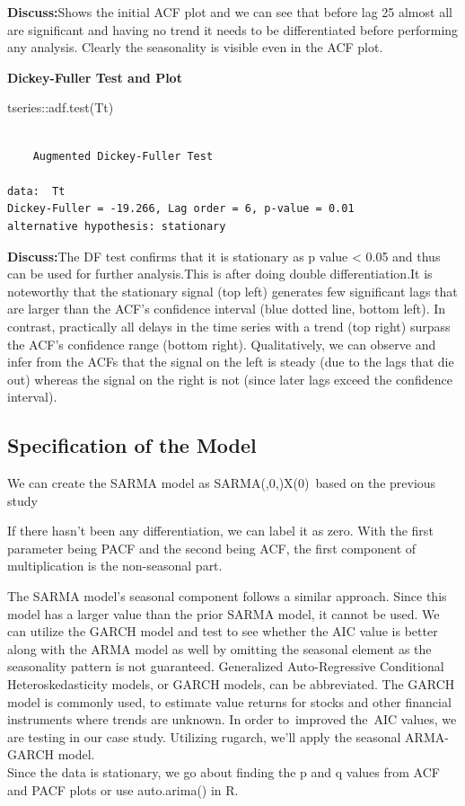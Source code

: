 \documentclass[
  onepage,
  openany]{scrbook}
\newenvironment{Shaded}{}{}
\newcommand{\FunctionTok}[1]{\textcolor[rgb]{0.02,0.16,0.49}{#1}}
\newcommand{\NormalTok}[1]{#1}
\newcommand{\SpecialCharTok}[1]{\textcolor[rgb]{0.25,0.44,0.63}{#1}}
\begin{document}
\textbf{Discuss:}Shows the initial ACF plot and we can see that before
lag 25 almost all are significant and having no trend it needs to be
differentiated before performing any analysis. Clearly the seasonality
is visible even in the ACF plot.

\textbf{Dickey-Fuller Test and Plot}

\begin{Shaded}
\begin{Highlighting}[]
\NormalTok{tseries}\SpecialCharTok{::}\FunctionTok{adf.test}\NormalTok{(Tt)}
\end{Highlighting}
\end{Shaded}

\begin{verbatim}

    Augmented Dickey-Fuller Test

data:  Tt
Dickey-Fuller = -19.266, Lag order = 6, p-value = 0.01
alternative hypothesis: stationary
\end{verbatim}

\textbf{Discuss:}The DF test confirms that it is stationary as p value
\textless{} 0.05 and thus can be used for further analysis.This is after
doing double differentiation.It is noteworthy that the stationary signal
(top left) generates few significant lags that are larger than the ACF's
confidence interval (blue dotted line, bottom left). In contrast,
practically all delays in the time series with a trend (top right)
surpass the ACF's confidence range (bottom right). Qualitatively, we can
observe and infer from the ACFs that the signal on the left is steady
(due to the lags that die out) whereas the signal on the right is not
(since later lags exceed the confidence interval).

\hypertarget{specification-of-the-model}{%
\subsection{Specification of the
Model}\label{specification-of-the-model}}

We can create the SARMA model as SARMA(,0,)X(0)~based on the previous
study ~

If there hasn't been any differentiation, we can label it as zero. With
the first parameter being PACF and the second being ACF, the first
component of multiplication is the non-seasonal part.

The SARMA model's seasonal component follows a similar approach. Since
this model has a larger value than the prior SARMA model, it cannot be
used. We can utilize the GARCH model and test to see whether the AIC
value is better along with the ARMA model as well by omitting the
seasonal element as the seasonality pattern is not guaranteed.
Generalized Auto-Regressive Conditional Heteroskedasticity models, or
GARCH models, can be abbreviated. The GARCH model is commonly used, to
estimate value returns for stocks and other financial instruments where
trends are unknown. In order to~improved the~AIC values, we are testing
in our case study. Utilizing rugarch, we'll apply the seasonal
ARMA-GARCH model.\\
Since the data is stationary, we go about finding the p and q values
from ACF and PACF plots or use auto.arima() in R.
\end{document}
